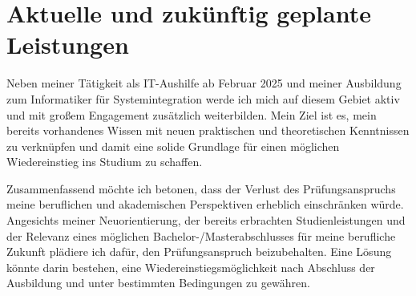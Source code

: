 \documentclass[a4paper,12pt]{article}
\begin{document}
\section*{\normalsize Aktuelle und zukünftig geplante Leistungen}
Neben meiner Tätigkeit als IT-Aushilfe ab Februar 2025 und meiner Ausbildung zum Informatiker für Systemintegration werde ich mich auf diesem Gebiet aktiv und mit großem Engagement zusätzlich weiterbilden.
Mein Ziel ist es, mein bereits vorhandenes Wissen mit neuen praktischen und theoretischen Kenntnissen zu verknüpfen und damit eine solide Grundlage für einen möglichen Wiedereinstieg ins Studium zu schaffen.

Zusammenfassend möchte ich betonen, dass der Verlust des Prüfungsanspruchs meine beruflichen und akademischen Perspektiven erheblich einschränken würde.
Angesichts meiner Neuorientierung, der bereits erbrachten Studienleistungen und der Relevanz eines möglichen Bachelor-/Masterabschlusses für meine berufliche Zukunft plädiere ich dafür, den Prüfungsanspruch beizubehalten.
Eine Lösung könnte darin bestehen, eine Wiedereinstiegsmöglichkeit nach Abschluss der Ausbildung und unter bestimmten Bedingungen zu gewähren.
\end{document}
